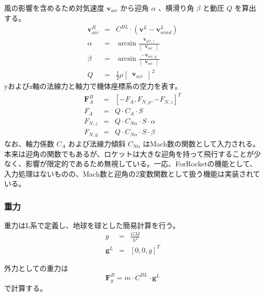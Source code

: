 ﻿\documentclass[a4paper]{jsarticle}
\begin{document}
風の影響を含めるため対気速度 $\bm{v}_{air}$ から迎角 $\alpha$ 、横滑り角 $\beta$ と動圧 $Q$ を算出する。
\begin{eqnarray}
\bm{v}_{air}^B &=& C^{BL} \cdot (\bm{v}^L - \bm{v}_{wind}^L) \\
\alpha &=& \arcsin{\frac{\bm{v}_{air,z}}{\begin{vmatrix}\bm{v}_{air}\end{vmatrix}}} \\
\beta &=& \arcsin{\frac{-\bm{v}_{air,y}}{\begin{vmatrix}\bm{v}_{air}\end{vmatrix}}} \\
Q &=& \frac{1}{2} \rho \begin{vmatrix}\bm{v}_{air}\end{vmatrix}^2
\end{eqnarray}
yおよびz軸の法線力と軸力で機体座標系の空力を表す。
\begin{eqnarray}
\bm{F}_A^B &=& [-F_A, F_{N,y}, -F_{N,z}]^T  \\
F_A &=& Q \cdot C_{A} \cdot S \\
F_{N,z} &=& Q \cdot C_{N\alpha} \cdot S \cdot \alpha \\
F_{N,y} &=& Q \cdot C_{N\alpha} \cdot S \cdot \beta
\end{eqnarray}
なお、軸力係数 $C_A$ および法線力傾斜 $C_{N\alpha}$ はMach数の関数として入力される。
本来は迎角の関数でもあるが、ロケットは大きな迎角を持って飛行することが少なく、影響が限定的であるため無視している。一応、ForRocketの機能として、入力処理はないものの、Mach数と迎角の2変数関数として扱う機能は実装されている。


\subsubsection{重力}
重力はL系で定義し、地球を球とした簡易計算を行う。
\begin{eqnarray}
g &=& \frac{GM}{h^2} \\
\bm{g}^L &=& [0, 0, g]^T
\end{eqnarray}

外力としての重力は
\begin{equation}
\bm{F}_g^B = m \cdot C^{BL} \cdot \bm{g}^L
\end{equation}
で計算する。
\end{document}
